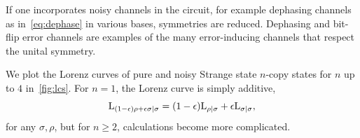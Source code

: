 \documentclass[pra,
aps,
twocolumn,
superscriptaddress,
groupedaddress,
nofootinbib,
reprint
]{revtex4-1}
\begin{document}
If one incorporates noisy channels in the circuit, for example dephasing channels as in~\cref{eq:dephase} in various bases, symmetries are reduced.
Dephasing and bit-flip error channels are examples of the many error-inducing channels that respect the unital symmetry. 

We plot the Lorenz curves of pure and noisy Strange state $n$-copy states for $n$ up to $4$ in~\cref{fig:lcs}.
For $n=1$, the Lorenz curve is simply additive, 
\begin{equation}
{{\rm{L}}_{(1-\epsilon)\rho + \epsilon\sigma|\sigma}} = (1-\epsilon){{\rm{L}}_{\rho|\sigma}} + \epsilon{{\rm{L}}_{\sigma|\sigma}},
\end{equation}
for any $\sigma, \rho$, but for $n\geq 2$, calculations become more complicated.

\begin{figure}%
    \centering
    \hspace{1pt}%
    \\
    \hspace{1pt}%
\end{figure}
\end{document}

